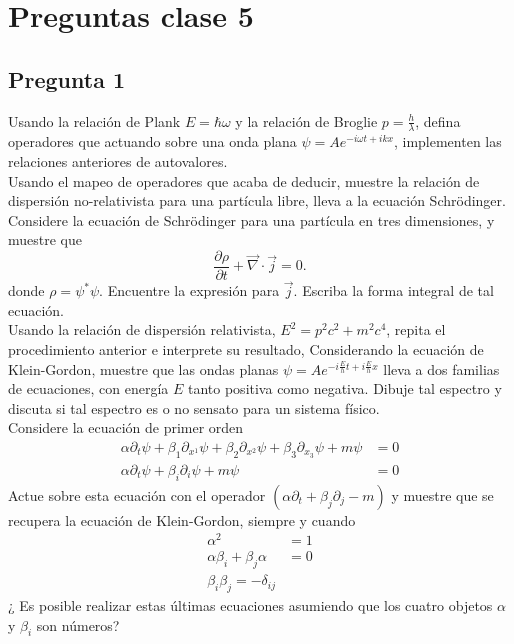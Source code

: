 \documentclass[../main_ej.tex]{subfiles}
\begin{document}
\section{Preguntas clase 5}

\subsection{Pregunta 1}
Usando la relación de Plank  $E=\hbar \omega$ y la relación de Broglie $p=\frac{h}{\lambda}$, defina operadores que actuando sobre una onda plana $\psi=Ae^{-i\omega t+ikx}$, implementen las relaciones anteriores de autovalores. \\
Usando el mapeo de operadores que acaba de deducir, muestre la relación de dispersión no-relativista para una partícula libre, lleva a la ecuación Schrödinger. \\
Considere la ecuación de Schrödinger para una partícula en tres dimensiones, y muestre que
\begin{equation*}
  \frac{\partial \rho}{\partial t} + \vec{\nabla} \cdot \vec{j} = 0.
\end{equation*}
donde $\rho=\psi^*\psi$. Encuentre la expresión para $\vec{j}$. Escriba la forma integral de tal ecuación. \\
Usando la relación de dispersión relativista, $E^2=p^2c^2 + m^2c^4$, repita el procedimiento anterior e interprete su resultado, Considerando la ecuación de Klein-Gordon, muestre que las ondas planas $  \psi=Ae^{-i\frac{E}{h}t + i\frac{E}{h}x}$ lleva a dos familias de ecuaciones, con energía $E$ tanto positiva como negativa. Dibuje tal espectro y discuta si tal espectro es  o no sensato para un sistema físico.\\
Considere la ecuación de primer orden 
\begin{align*}
  \alpha \partial_t \psi +\beta_1 \partial_{x^1}\psi + \beta_2 \partial_{x^2}\psi + \beta_3\partial_{x_3}\psi + m\psi  & = 0 \\
  \alpha \partial_t \psi + \beta_i \partial_i\psi + m\psi & = 0
\end{align*}
Actue sobre esta ecuación con el operador $(\alpha \partial_t+\beta_j\partial_j - m)$ y muestre que se recupera la ecuación de Klein-Gordon, siempre y cuando
\begin{align*}
  \alpha^2  & = 1 \\
  \alpha \beta_i + \beta_j \alpha & = 0 \\
  \beta_i\beta_j = -\delta_{ij}
\end{align*}
¿ Es posible realizar estas últimas ecuaciones asumiendo que los cuatro objetos $\alpha$ y $\beta_i$ son números? \\
\end{document}
